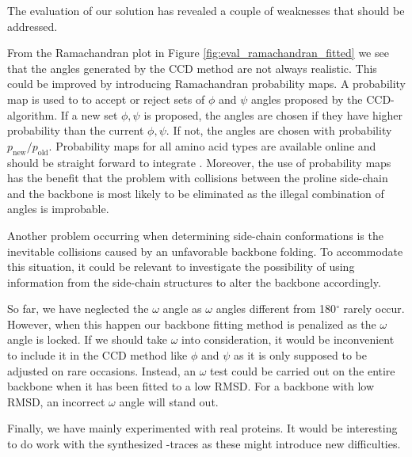 The evaluation of our solution has revealed a couple of weaknesses that should be addressed. 

From the Ramachandran plot in Figure \ref{fig:eval_ramachandran_fitted} we see that the angles generated by the CCD method are not always realistic.
This could be improved by introducing Ramachandran probability maps.
A probability map is used to to accept or reject sets of $\phi$ and $\psi$ angles proposed by the CCD-algorithm.
If a new set $\phi,\psi$ is proposed, the angles are chosen if they have higher probability than the current $\phi,\psi$.
If not, the angles are chosen with probability $p_{\text{new}}/p_{\text{old}}$. 
Probability maps for all amino acid types are available online and should be straight forward to integrate \cite{10.1371/journal.pcbi.1000763}.
Moreover, the use of probability maps has the benefit that the problem with collisions between the proline side-chain and the backbone is most likely to be eliminated as the illegal combination of angles is improbable. 

Another problem occurring when determining side-chain conformations is the inevitable collisions caused by an unfavorable backbone folding. 
To accommodate this situation, it could be relevant to investigate the possibility of using information from the side-chain structures to alter the backbone accordingly. 

So far, we have neglected the $\omega$ angle as $\omega$ angles different from 180$^\circ$ rarely occur. 
However, when this happen our backbone fitting method is penalized as the $\omega$ angle is locked.
If we should take $\omega$ into consideration, it would be inconvenient to include it in the CCD method like $\phi$ and $\psi$ as it is only supposed to be adjusted on rare occasions.
Instead, an $\omega$ test could be carried out on the entire backbone when it has been fitted to a low RMSD.
For a backbone with low RMSD, an incorrect $\omega$ angle will stand out.

Finally, we have mainly experimented with real proteins. 
It would be interesting to do work with the synthesized \Ca-traces as these might introduce new difficulties.




